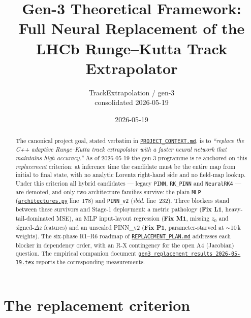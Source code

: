 \documentclass[11pt,a4paper]{article}
\title{Gen-3 Theoretical Framework:\\
       Full Neural Replacement of the LHCb Runge--Kutta Track Extrapolator}
\author{TrackExtrapolation / gen-3 \\ \small consolidated 2026-05-19}
\date{2026-05-19}
\newcommand{\dz}{\Delta z}
\begin{document}
\maketitle

\begin{abstract}
The canonical project goal, stated verbatim in
\href{run:../../PROJECT_CONTEXT.md}{\texttt{PROJECT\_CONTEXT.md}}, is to
\emph{``replace the C++ adaptive Runge--Kutta track extrapolator with a faster
neural network that maintains high accuracy.''} As of 2026-05-19 the gen-3
programme is re-anchored on this \emph{replacement} criterion: at inference
time the candidate must be the entire map from initial to final state, with no
analytic Lorentz right-hand side and no field-map lookup. Under this criterion
all hybrid candidates --- legacy \texttt{PINN}, \texttt{RK\_PINN} and
\texttt{NeuralRK4} --- are demoted, and only two architecture families survive:
the plain \texttt{MLP} (\href{run:../../experiments/gen_3/models/architectures.py}{\texttt{architectures.py}}
line~178) and \texttt{PINN\_v2} (\emph{ibid.} line~232). Three blockers stand
between these survivors and Stage-1 deployment: a metric pathology
(\textbf{Fix L1}, heavy-tail-dominated MSE), an MLP input-layout regression
(\textbf{Fix M1}, missing $z_0$ and signed-$\dz$ features) and an unscaled
PINN\_v2 (\textbf{Fix P1}, parameter-starved at $\sim$10\,k weights). The
six-phase \mbox{R1--R6} roadmap of
\href{run:../../experiments/gen_3/REPLACEMENT_PLAN.md}{\texttt{REPLACEMENT\_PLAN.md}}
addresses each blocker in dependency order, with an R-X contingency for the
open A4 (Jacobian) question. The empirical companion document
\href{run:gen3_replacement_results_2026-05-19.tex}{\texttt{gen3\_replacement\_results\_2026-05-19.tex}}
reports the corresponding measurements.
\end{abstract}

\section{The replacement criterion}\label{sec:criterion}
\end{document}
